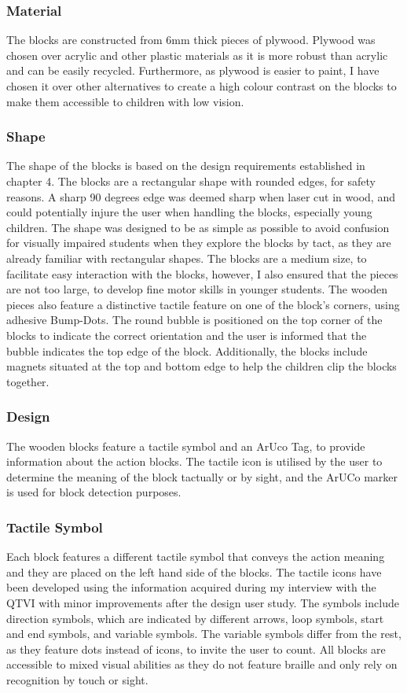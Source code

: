 \documentclass[oneside,%
                    author={Malak Hajji},
                    degree={BSc},
                    title={Designing An Accessible Computational Toolkit For Students},
                  subtitle={With Mixed Visual Abilities}]{dissertation}
\begin{document}
\subsubsection{Material}
The blocks are constructed from 6mm thick pieces of plywood. Plywood was chosen over acrylic and other plastic materials as it is more robust than acrylic and can be easily recycled. Furthermore, as plywood is easier to paint, I have chosen it over other alternatives to create a high colour contrast on the blocks to make them accessible to children with low vision.
\subsubsection{Shape}
The shape of the blocks is based on the design requirements established in chapter 4. The blocks are a rectangular shape with rounded edges, for safety reasons. A sharp 90 degrees edge was deemed sharp when laser cut in wood, and could potentially injure the user when handling the blocks, especially young children. The shape was designed to be as simple as possible to avoid confusion for visually impaired students when they explore the blocks by tact, as they are already familiar with rectangular shapes. The blocks are a medium size, to facilitate easy interaction with the blocks, however, I also ensured that the pieces are not too large, to develop fine motor skills in younger students. The wooden pieces also feature a distinctive tactile feature on one of the block’s corners, using adhesive Bump-Dots. The round bubble is positioned on the top corner of the blocks to indicate the correct orientation and the user is informed that the bubble indicates the top edge of the block. Additionally, the blocks include magnets situated at the top and bottom edge to help the children clip the blocks together.

\subsubsection{Design}
The wooden blocks feature a tactile symbol and an ArUco Tag, to provide information about the action blocks. The tactile icon is utilised by the user to determine the meaning of the block tactually or by sight, and the ArUCo marker is used for block detection purposes. 
\subsubsection{Tactile Symbol}
Each block features a different tactile symbol that conveys the action meaning and they are placed on the left hand side of the blocks. The tactile icons have been developed using the information acquired during my interview with the QTVI with minor improvements after the design user study. The symbols include direction symbols, which are indicated by different arrows, loop symbols, start and end symbols, and variable symbols. The variable symbols differ from the rest, as they feature dots instead of icons, to invite the user to count.  All blocks are accessible to mixed visual abilities as they do not feature braille and only rely on recognition by touch or sight.
\end{document}
